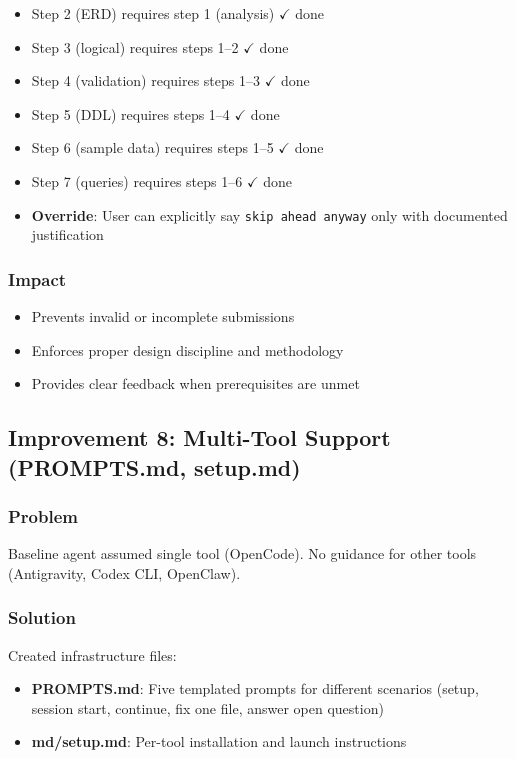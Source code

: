 \documentclass[12pt,a4paper]{article}
\begin{document}
\begin{itemize}
    \item Step 2 (ERD) requires step 1 (analysis) $\checkmark$ done
    \item Step 3 (logical) requires steps 1--2 $\checkmark$ done
    \item Step 4 (validation) requires steps 1--3 $\checkmark$ done
    \item Step 5 (DDL) requires steps 1--4 $\checkmark$ done
    \item Step 6 (sample data) requires steps 1--5 $\checkmark$ done
    \item Step 7 (queries) requires steps 1--6 $\checkmark$ done
    \item \textbf{Override}: User can explicitly say \texttt{skip ahead anyway} only with documented justification
\end{itemize}

\subsubsection{Impact}
\begin{itemize}
    \item Prevents invalid or incomplete submissions
    \item Enforces proper design discipline and methodology
    \item Provides clear feedback when prerequisites are unmet
\end{itemize}

\subsection{Improvement 8: Multi-Tool Support (PROMPTS.md, setup.md)}

\subsubsection{Problem}
Baseline agent assumed single tool (OpenCode). No guidance for other tools (Antigravity, Codex CLI, OpenClaw).

\subsubsection{Solution}
Created infrastructure files:

\begin{itemize}
    \item \textbf{PROMPTS.md}: Five templated prompts for different scenarios (setup, session start, continue, fix one file, answer open question)
    \item \textbf{md/setup.md}: Per-tool installation and launch instructions
\end{itemize}
\end{document}
